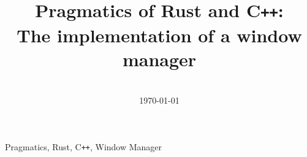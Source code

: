 \documentclass[conference]{IEEEtran}
\begin{document}
\title{
  Pragmatics of Rust and C\texttt{++}:\\
  The implementation of a window manager\\
}

\author{
  \\
  \vspace*{20pt} \normalsize  \today{}\vspace*{-20pt}
}

\maketitle
\thispagestyle{footernumberstyle}



\begin{IEEEkeywords}
	Pragmatics, Rust, C\texttt{++}, Window Manager
\end{IEEEkeywords}













\end{document}
